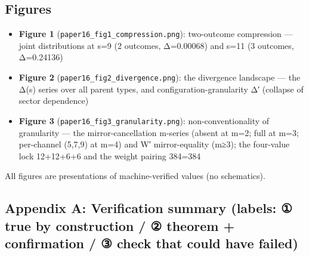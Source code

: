 \documentclass[
]{ltjsarticle}
\providecommand{\tightlist}{%
  \setlength{\itemsep}{0pt}\setlength{\parskip}{0pt}}
\begin{document}
\subsection{Figures}\label{figures}

\begin{itemize}
\tightlist
\item
  \textbf{Figure 1} (\texttt{paper16\_fig1\_compression.png}):
  two-outcome compression --- joint distributions at s=9 (2 outcomes,
  Δ=0.00068) and s=11 (3 outcomes, Δ=0.24136)
\item
  \textbf{Figure 2} (\texttt{paper16\_fig2\_divergence.png}): the
  divergence landscape --- the Δ(s) series over all parent types, and
  configuration-granularity Δ′ (collapse of sector dependence)
\item
  \textbf{Figure 3} (\texttt{paper16\_fig3\_granularity.png}):
  non-conventionality of granularity --- the mirror-cancellation
  m-series (absent at m=2; full at m=3; per-channel (5,7,9) at m=4) and
  W′ mirror-equality (m≥3); the four-value lock 12+12+6+6 and the weight
  pairing 384=384
\end{itemize}

All figures are presentations of machine-verified values (no
schematics).

\subsection{Appendix A: Verification summary (labels: ① true by
construction / ② theorem + confirmation / ③ check that could have
failed)}\label{appendix-a-verification-summary-labels-ux2460-true-by-construction-ux2461-theorem-confirmation-ux2462-check-that-could-have-failed}
\end{document}
